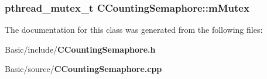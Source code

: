 \subsubsection[{m\-Mutex}]{\setlength{\rightskip}{0pt plus 5cm}pthread\-\_\-mutex\-\_\-t C\-Counting\-Semaphore\-::m\-Mutex\hspace{0.3cm}{\ttfamily [private]}}\label{classCCountingSemaphore_abb3c969943f9b5793a4204914ca95286}


The documentation for this class was generated from the following files\-:\begin{DoxyCompactItemize}
\item 
Basic/include/{\bf C\-Counting\-Semaphore.\-h}\item 
Basic/source/{\bf C\-Counting\-Semaphore.\-cpp}\end{DoxyCompactItemize}
